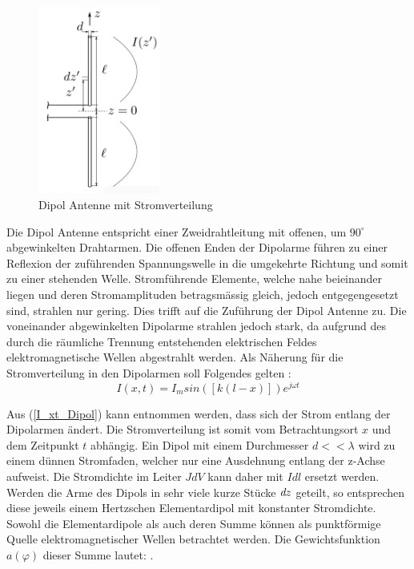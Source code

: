\begin{figure}[!ht]
	\centering
	\includegraphics[width=4cm]{content/bilder/Dipol_EMANT_S42.pdf}%
	\caption{Dipol Antenne mit Stromverteilung \cite{Tekom}}
	\label{FitzDipol}
\end{figure}
Die Dipol Antenne entspricht einer Zweidrahtleitung mit offenen, um $90^\circ$ abgewinkelten Drahtarmen. Die offenen Enden der Dipolarme führen zu einer Reflexion der zuführenden Spannungswelle in die umgekehrte Richtung und somit zu einer stehenden Welle. Stromführende Elemente, welche nahe beieinander liegen und deren Stromamplituden betragsmässig gleich, jedoch entgegengesetzt sind, strahlen nur gering. Dies trifft auf die Zuführung der Dipol Antenne zu. Die voneinander abgewinkelten Dipolarme strahlen jedoch stark, da aufgrund des durch die räumliche Trennung entstehenden elektrischen Feldes elektromagnetische Wellen abgestrahlt werden.
Als Näherung für die Stromverteilung in den Dipolarmen soll Folgendes gelten \cite{elliott1981antenna}:
\begin{equation}\label{I_xt_Dipol} 
I(x,t) =I_{m}sin([k(l-x)])e^{j\omega t}
\end{equation}

Aus  (\ref{I_xt_Dipol}) kann entnommen werden, dass sich der Strom entlang der Dipolarmen ändert. Die Stromverteilung ist somit vom Betrachtungsort $x$ und dem Zeitpunkt $t$ abhängig. Ein Dipol mit einem Durchmesser $d<<\lambda$ wird  zu einem dünnen Stromfaden, welcher nur eine Ausdehnung entlang der z-Achse aufweist. Die Stromdichte im Leiter $J \textit{d}V$ kann daher mit $I\textit{d}l$ ersetzt werden. Werden die Arme des Dipols in sehr viele kurze Stücke $\textit{\textit{d}}z$ geteilt, so entsprechen diese jeweils einem Hertzschen Elementardipol mit konstanter Stromdichte. Sowohl die Elementardipole als auch deren Summe können als punktförmige Quelle elektromagnetischer Wellen betrachtet werden. Die Gewichtsfunktion $a(\varphi)$ dieser Summe lautet: \cite{elliott1981antenna}.\\

